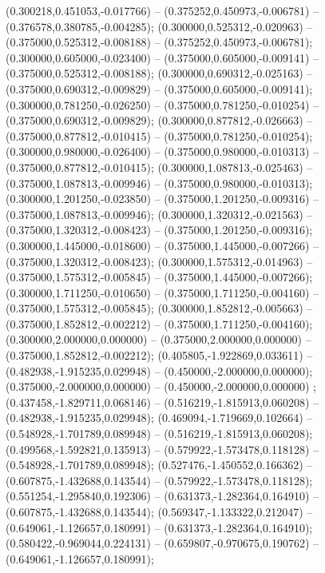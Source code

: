  (0.300218,0.451053,-0.017766) -- (0.375252,0.450973,-0.006781) -- (0.376578,0.380785,-0.004285);
 (0.300000,0.525312,-0.020963) -- (0.375000,0.525312,-0.008188) -- (0.375252,0.450973,-0.006781);
 (0.300000,0.605000,-0.023400) -- (0.375000,0.605000,-0.009141) -- (0.375000,0.525312,-0.008188);
 (0.300000,0.690312,-0.025163) -- (0.375000,0.690312,-0.009829) -- (0.375000,0.605000,-0.009141);
 (0.300000,0.781250,-0.026250) -- (0.375000,0.781250,-0.010254) -- (0.375000,0.690312,-0.009829);
 (0.300000,0.877812,-0.026663) -- (0.375000,0.877812,-0.010415) -- (0.375000,0.781250,-0.010254);
 (0.300000,0.980000,-0.026400) -- (0.375000,0.980000,-0.010313) -- (0.375000,0.877812,-0.010415);
 (0.300000,1.087813,-0.025463) -- (0.375000,1.087813,-0.009946) -- (0.375000,0.980000,-0.010313);
 (0.300000,1.201250,-0.023850) -- (0.375000,1.201250,-0.009316) -- (0.375000,1.087813,-0.009946);
 (0.300000,1.320312,-0.021563) -- (0.375000,1.320312,-0.008423) -- (0.375000,1.201250,-0.009316);
 (0.300000,1.445000,-0.018600) -- (0.375000,1.445000,-0.007266) -- (0.375000,1.320312,-0.008423);
 (0.300000,1.575312,-0.014963) -- (0.375000,1.575312,-0.005845) -- (0.375000,1.445000,-0.007266);
 (0.300000,1.711250,-0.010650) -- (0.375000,1.711250,-0.004160) -- (0.375000,1.575312,-0.005845);
 (0.300000,1.852812,-0.005663) -- (0.375000,1.852812,-0.002212) -- (0.375000,1.711250,-0.004160);
 (0.300000,2.000000,0.000000) -- (0.375000,2.000000,0.000000) -- (0.375000,1.852812,-0.002212);
 (0.405805,-1.922869,0.033611) -- (0.482938,-1.915235,0.029948) -- (0.450000,-2.000000,0.000000);
 (0.375000,-2.000000,0.000000) -- (0.450000,-2.000000,0.000000) ;
 (0.437458,-1.829711,0.068146) -- (0.516219,-1.815913,0.060208) -- (0.482938,-1.915235,0.029948);
 (0.469094,-1.719669,0.102664) -- (0.548928,-1.701789,0.089948) -- (0.516219,-1.815913,0.060208);
 (0.499568,-1.592821,0.135913) -- (0.579922,-1.573478,0.118128) -- (0.548928,-1.701789,0.089948);
 (0.527476,-1.450552,0.166362) -- (0.607875,-1.432688,0.143544) -- (0.579922,-1.573478,0.118128);
 (0.551254,-1.295840,0.192306) -- (0.631373,-1.282364,0.164910) -- (0.607875,-1.432688,0.143544);
 (0.569347,-1.133322,0.212047) -- (0.649061,-1.126657,0.180991) -- (0.631373,-1.282364,0.164910);
 (0.580422,-0.969044,0.224131) -- (0.659807,-0.970675,0.190762) -- (0.649061,-1.126657,0.180991);
